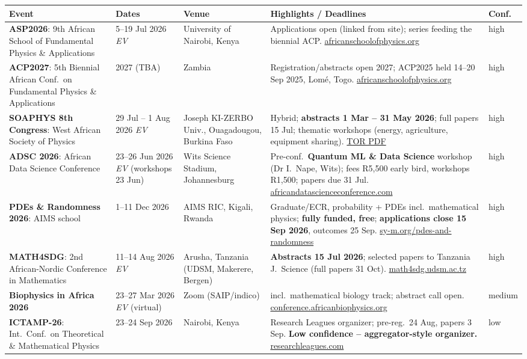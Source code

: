 \documentclass[11pt,a4paper]{article}
\newcommand{\ev}{\emph{EV}}
\begin{document}
\begin{longtable}{@{}p{3.2cm}p{3.0cm}p{2.5cm}p{5.2cm}p{1.6cm}@{}}
\toprule
\textbf{Event} & \textbf{Dates} & \textbf{Venue} & \textbf{Highlights / Deadlines} & \textbf{Conf.} \\
\midrule
\endhead
\textbf{ASP2026}: 9th African School of Fundamental Physics \& Applications
  & 5--19 Jul 2026 \ev{}
  & University of Nairobi, Kenya
  & Applications open (linked from site); series feeding the biennial ACP. \href{https://africanschoolofphysics.org/}{africanschoolofphysics.org}
  & high \\
\midrule
\textbf{ACP2027}: 5th Biennial African Conf.\ on Fundamental Physics \& Applications
  & 2027 (TBA)
  & Zambia
  & Registration/abstracts open 2027; ACP2025 held 14--20 Sep 2025, Lomé, Togo. \href{https://africanschoolofphysics.org/}{africanschoolofphysics.org}
  & high \\
\midrule
\textbf{SOAPHYS 8th Congress}: West African Society of Physics
  & 29 Jul -- 1 Aug 2026 \ev{}
  & Joseph KI-ZERBO Univ., Ouagadougou, Burkina Faso
  & Hybrid; \textbf{abstracts 1 Mar -- 31 May 2026}; full papers 15 Jul; thematic workshops (energy, agriculture, equipment sharing). \href{https://www.lecames.org/wp-content/uploads/2026/05/TDR-SOAPHYS-8th-Congres-08052026ENG.pdf}{TOR PDF}
  & high \\
\midrule
\textbf{ADSC 2026}: African Data Science Conference
  & 23--26 Jun 2026 \ev{} (workshops 23 Jun)
  & Wits Science Stadium, Johannesburg
  & Pre-conf.\ \textbf{Quantum ML \& Data Science} workshop (Dr I.\ Nape, Wits); fees R5{,}500 early bird, workshops R1{,}500; papers due 31 Jul. \href{https://africandatascienceconference.com/}{africandatascienceconference.com}
  & high \\
\midrule
\textbf{PDEs \& Randomness 2026}: AIMS school
  & 1--11 Dec 2026
  & AIMS RIC, Kigali, Rwanda
  & Graduate/ECR, probability + PDEs incl.\ mathematical physics; \textbf{fully funded, free}; \textbf{applications close 15 Sep 2026}, outcomes 25 Sep. \href{https://sy-m.org/pdes-and-randomness.html}{sy-m.org/pdes-and-randomness}
  & high \\
\midrule
\textbf{MATH4SDG}: 2nd African-Nordic Conference in Mathematics
  & 11--14 Aug 2026 \ev{}
  & Arusha, Tanzania (UDSM, Makerere, Bergen)
  & \textbf{Abstracts 15 Jul 2026}; selected papers to Tanzania J.\ Science (full papers 31 Oct). \href{https://math4sdg.udsm.ac.tz/2026-conference}{math4sdg.udsm.ac.tz}
  & high \\
\midrule
\textbf{Biophysics in Africa 2026}
  & 23--27 Mar 2026 \ev{} (virtual)
  & Zoom (SAIP/indico)
  & incl.\ mathematical biology track; abstract call open. \href{http://conference.africanbiophysics.org/}{conference.africanbiophysics.org}
  & medium \\
\midrule
\textbf{ICTAMP-26}: Int.\ Conf.\ on Theoretical \& Mathematical Physics
  & 23--24 Sep 2026
  & Nairobi, Kenya
  & Research Leagues organizer; pre-reg.\ 24 Aug, papers 3 Sep. \textbf{Low confidence -- aggregator-style organizer.} \href{https://researchleagues.com/event/index.php?id=101136329}{researchleagues.com}
  & low \\
\bottomrule
\end{longtable}
\end{document}
